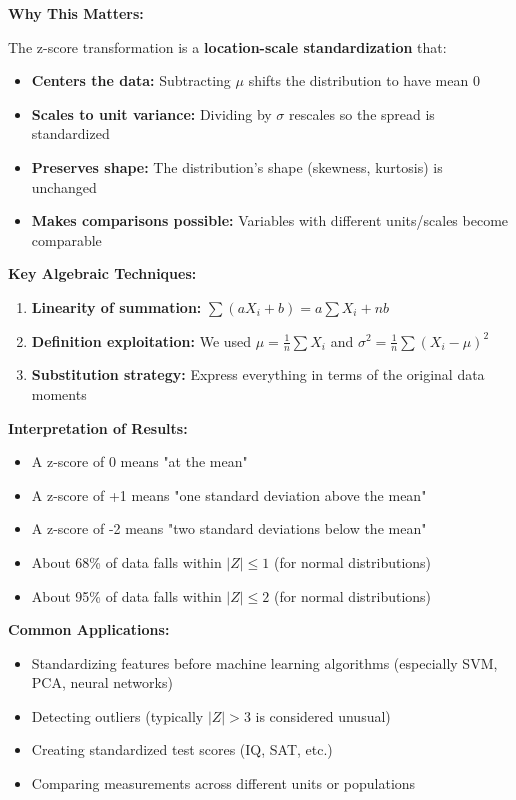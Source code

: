 \documentclass[12pt]{article}
\begin{document}
\begin{explanation}
\textbf{Why This Matters:}

The z-score transformation is a \textbf{location-scale standardization} that:
\begin{itemize}
    \item \textbf{Centers the data:} Subtracting \(\mu\) shifts the distribution to have mean 0
    \item \textbf{Scales to unit variance:} Dividing by \(\sigma\) rescales so the spread is standardized
    \item \textbf{Preserves shape:} The distribution's shape (skewness, kurtosis) is unchanged
    \item \textbf{Makes comparisons possible:} Variables with different units/scales become comparable
\end{itemize}

\textbf{Key Algebraic Techniques:}
\begin{enumerate}
    \item \textbf{Linearity of summation:} \(\sum(aX_i + b) = a\sum X_i + nb\)
    \item \textbf{Definition exploitation:} We used \(\mu = \frac{1}{n}\sum X_i\) and \(\sigma^2 = \frac{1}{n}\sum(X_i-\mu)^2\)
    \item \textbf{Substitution strategy:} Express everything in terms of the original data moments
\end{enumerate}

\textbf{Interpretation of Results:}
\begin{itemize}
    \item A z-score of 0 means "at the mean"
    \item A z-score of +1 means "one standard deviation above the mean"
    \item A z-score of -2 means "two standard deviations below the mean"
    \item About 68\% of data falls within \(|Z| \leq 1\) (for normal distributions)
    \item About 95\% of data falls within \(|Z| \leq 2\) (for normal distributions)
\end{itemize}

\textbf{Common Applications:}
\begin{itemize}
    \item Standardizing features before machine learning algorithms (especially SVM, PCA, neural networks)
    \item Detecting outliers (typically \(|Z| > 3\) is considered unusual)
    \item Creating standardized test scores (IQ, SAT, etc.)
    \item Comparing measurements across different units or populations
\end{itemize}
\end{explanation}
\end{document}
